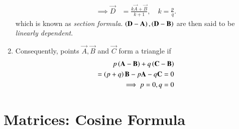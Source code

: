 \begin{enumerate}[label=\thesection.\arabic*.,ref=\thesection.\theenumi]
\begin{align}
			\implies \vec{D} &= \frac{k\vec{A}+\vec{B}}{k+1}, \quad k = \frac{p}{q}.
	  \label{eq:section_formula}
			\end{align} 
	which is known as {\em section formula}. $\left(\mathbf{D}-\mathbf{A}\right), \left(\mathbf{D}-\mathbf{B}\right)$ 
		are then said to be {\em linearly dependent}.
  \item Consequently, points $\vec{A},\vec{B}$ and $\vec{C}$ form a triangle  if 
	  \label{prop:two-tri-indep}
  \begin{align}
	  p\left(\mathbf{A}- \mathbf{B}\right) +q\left(\mathbf{C} -\mathbf{B}\right) 
	  \\
	  =\left(p+q\right)\mathbf{B}- p\mathbf{A} -q\mathbf{C} = 0
	  \\
	  \implies p=0, q=0
	  \label{eq:two-tri-indep}
  \end{align}
\end{enumerate}
\section{Matrices: Cosine Formula}
